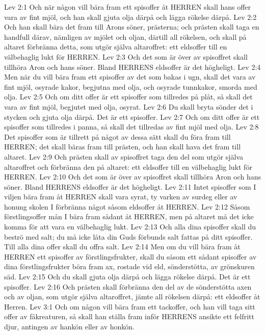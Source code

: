 Lev 2:1  Och när någon vill bära fram ett spisoffer åt HERREN skall hans offer vara av fint mjöl, och han skall gjuta olja därpå och lägga rökelse därpå.
Lev 2:2  Och han skall bära det fram till Arons söner, prästerna; och prästen skall taga en handfull därav, nämligen av mjölet och oljan, därtill all rökelsen, och skall på altaret förbränna detta, som utgör själva altaroffret: ett eldsoffer till en välbehaglig lukt för HERREN.
Lev 2:3  Och det som är över av spisoffret skall tillhöra Aron och hans söner. Bland HERRENS eldsoffer är det högheligt.
Lev 2:4  Men när du vill bära fram ett spisoffer av det som bakas i ugn, skall det vara av fint mjöl, osyrade kakor, begjutna med olja, och osyrade tunnkakor, smorda med olja.
Lev 2:5  Och om ditt offer är ett spisoffer som tillredes på plåt, så skall det vara av fint mjöl, begjutet med olja, osyrat.
Lev 2:6  Du skall bryta sönder det i stycken och gjuta olja därpå. Det är ett spisoffer.
Lev 2:7  Och om ditt offer är ett spisoffer som tillredes i panna, så skall det tillredas av fint mjöl med olja.
Lev 2:8  Det spisoffer som är tillrett på något av dessa sätt skall du föra fram till HERREN; det skall bäras fram till prästen, och han skall hava det fram till altaret.
Lev 2:9  Och prästen skall av spisoffret taga den del som utgör själva altaroffret och förbränna den på altaret: ett eldsoffer till en välbehaglig lukt för HERREN.
Lev 2:10  Och det som är över av spisoffret skall tillhöra Aron och hans söner. Bland HERRENS eldsoffer är det högheligt.
Lev 2:11  Intet spisoffer som I viljen bära fram åt HERREN skall vara syrat, ty varken av surdeg eller av honung skolen I förbränna något såsom eldsoffer åt HERREN.
Lev 2:12  Såsom förstlingsoffer mån I bära fram sådant åt HERREN, men på altaret må det icke komma för att vara en välbehaglig lukt.
Lev 2:13  Och alla dina spisoffer skall du beströ med salt; du må icke låta din Guds förbunds salt fattas på ditt spisoffer. Till alla dina offer skall du offra salt.
Lev 2:14  Men om du vill bära fram åt HERREN ett spisoffer av förstlingsfrukter, skall du såsom ett sådant spisoffer av dina förstlingsfrukter böra fram ax, rostade vid eld, sönderstötta, av grönskuren säd.
Lev 2:15  Och du skall gjuta olja därpå och lägga rökelse därpå. Det är ett spisoffer.
Lev 2:16  Och prästen skall förbränna den del av de sönderstötta axen och av oljan, som utgör själva altaroffret, jämte all rökelsen därpå: ett eldsoffer åt Herren.
Lev 3:1  Och om någon vill bära fram ett tackoffer, och han vill taga sitt offer av fäkreaturen, så skall han ställa fram inför HERRENS ansikte ett felfritt djur, antingen av hankön eller av honkön.
